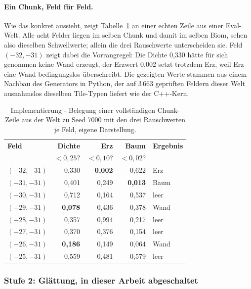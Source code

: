 \documentclass[11pt,a4paper]{article}
\begin{document}
\paragraph{Ein Chunk, Feld für Feld.} Wie das konkret aussieht, zeigt
Tabelle~\ref{tab:trace} an einer echten Zeile aus einer Eval-Welt. Alle acht
Felder liegen im selben Chunk und damit im selben Biom, sehen also dieselben
Schwellwerte; allein die drei Rauschwerte unterscheiden sie. Feld
$(-32,-31)$ zeigt dabei die Vorrangregel: Die Dichte 0,330 hätte für sich
genommen keine Wand erzeugt, der Erzwert 0,002 setzt trotzdem Erz, weil Erz
eine Wand bedingungslos überschreibt. Die gezeigten Werte stammen aus einem
Nachbau des Generators in Python, der auf 3\,663 geprüften Feldern dieser
Welt ausnahmslos dieselben Tile-Typen liefert wie der C++-Kern.

\begin{table}[htbp]
\centering
\small
\begin{tabular}{@{}lrrrl@{}}
\toprule
\textbf{Feld} & \textbf{Dichte} & \textbf{Erz} & \textbf{Baum} & \textbf{Ergebnis} \\
 & \tiny{$<0{,}25$?} & \tiny{$<0{,}10$?} & \tiny{$<0{,}02$?} & \\
\midrule
$(-32,-31)$ & 0,330 & \textbf{0,002} & 0,622 & Erz \\
$(-31,-31)$ & 0,401 & 0,249 & \textbf{0,013} & Baum \\
$(-30,-31)$ & 0,712 & 0,164 & 0,537 & leer \\
$(-29,-31)$ & \textbf{0,078} & 0,436 & 0,378 & Wand \\
$(-28,-31)$ & 0,357 & 0,994 & 0,217 & leer \\
$(-27,-31)$ & 0,370 & 0,376 & 0,154 & leer \\
$(-26,-31)$ & \textbf{0,186} & 0,149 & 0,064 & Wand \\
$(-25,-31)$ & 0,559 & 0,481 & 0,579 & leer \\
\bottomrule
\end{tabular}
\caption[Belegung einer Chunk-Zeile Feld für Feld]{Implementierung - Belegung
einer vollständigen Chunk-Zeile aus der Welt zu Seed 7000 mit den drei
Rauschwerten je Feld, eigene Darstellung.}
\label{tab:trace}
\end{table}

\subsubsection*{Stufe 2: Glättung, in dieser Arbeit abgeschaltet}
\end{document}
